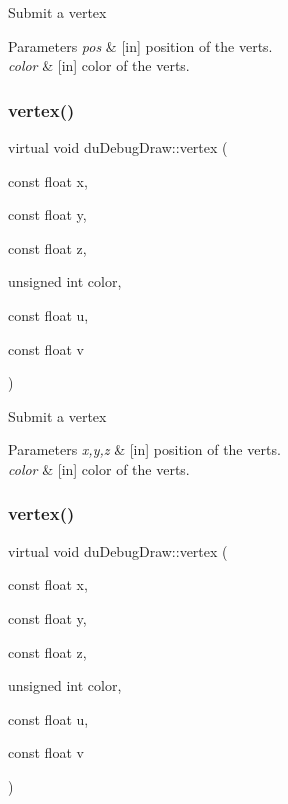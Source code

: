 Submit a vertex 
\begin{DoxyParams}{Parameters}
{\em pos} & \mbox{[}in\mbox{]} position of the verts. \\
\hline
{\em color} & \mbox{[}in\mbox{]} color of the verts. \\
\hline
\end{DoxyParams}
\mbox{\label{structduDebugDraw_a0f76c61eb9f274f17c91308c739211eb}} 
\subsubsection{\texorpdfstring{vertex()}{vertex()}\hspace{0.1cm}{\footnotesize\ttfamily [7/8]}}
{\footnotesize\ttfamily virtual void du\+Debug\+Draw\+::vertex (\begin{DoxyParamCaption}\item[{const float}]{x,  }\item[{const float}]{y,  }\item[{const float}]{z,  }\item[{unsigned int}]{color,  }\item[{const float}]{u,  }\item[{const float}]{v }\end{DoxyParamCaption})\hspace{0.3cm}{\ttfamily [pure virtual]}}

Submit a vertex 
\begin{DoxyParams}{Parameters}
{\em x,y,z} & \mbox{[}in\mbox{]} position of the verts. \\
\hline
{\em color} & \mbox{[}in\mbox{]} color of the verts. \\
\hline
\end{DoxyParams}
\mbox{\label{structduDebugDraw_a0f76c61eb9f274f17c91308c739211eb}} 
\subsubsection{\texorpdfstring{vertex()}{vertex()}\hspace{0.1cm}{\footnotesize\ttfamily [8/8]}}
{\footnotesize\ttfamily virtual void du\+Debug\+Draw\+::vertex (\begin{DoxyParamCaption}\item[{const float}]{x,  }\item[{const float}]{y,  }\item[{const float}]{z,  }\item[{unsigned int}]{color,  }\item[{const float}]{u,  }\item[{const float}]{v }\end{DoxyParamCaption})\hspace{0.3cm}{\ttfamily [pure virtual]}}

